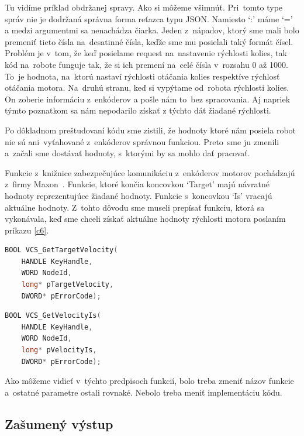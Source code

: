 Tu vidíme príklad obdržanej spravy. Ako si môžeme všimnúť. Pri~tomto type správ nie je dodržaná správna forma reťazca typu JSON. Namiesto `:' máme `='
a medzi argumentmi sa nenachádza čiarka. Jeden z~nápadov, ktorý sme mali bolo premeniť tieto čísla na~desatinné čísla, keďže sme mu posielali taký formát čísel.
Problém je v~tom, že keď posielame request na~nastavenie rýchlosti kolies, tak kód na~robote funguje tak, že si ich premení na~celé čísla v~rozsahu 0 až 1000.
To~je hodnota, na~ktorú nastaví rýchlosti otáčania kolies respektíve rýchlosť otáčania motora. Na~druhú stranu, keď si vypýtame od~robota rýchlosti kolies. On zoberie
informáciu z~enkóderov a pošle nám to~bez spracovania. Aj napriek týmto poznatkom sa nám nepodarilo získať z týchto dát žiadané rýchlosti.

Po dôkladnom preštudovaní kódu sme zistili, že hodnoty ktoré nám posiela robot nie sú ani~vyťahované z~enkóderov správnou funkciou. Preto~sme ju zmenili
a~začali sme dostávať hodnoty, s~ktorými by sa mohlo dať pracovať.

Funkcie z~knižnice zabezpečujúce komunikáciu z~enkóderov motorov pochádzajú z~firmy Maxon~\cite{EPOSdoc}. Funkcie, ktoré končia koncovkou `Target' majú
návratné hodnoty reprezentujúce žiadané hodnoty. Funkcie s~koncovkou `Is' vracajú aktuálne hodnoty. Z~tohto dôvodu sme museli prepísať funkciu, ktorá sa vykonávala,
keď sme chceli získať aktuálne hodnoty rýchlosti motora poslaním príkazu \ref{c6}.


\label{VelocityIs}
\begin{lstlisting}[language=C++]
BOOL VCS_GetTargetVelocity(
	HANDLE KeyHandle,
	WORD NodeId,
	long* pTargetVelocity,
	DWORD* pErrorCode);
\end{lstlisting}

\begin{lstlisting}[language=C++]
BOOL VCS_GetVelocityIs(
	HANDLE KeyHandle,
	WORD NodeId,
	long* pVelocityIs,
	DWORD* pErrorCode);
\end{lstlisting}

\noindent Ako môžeme vidieť v~týchto predpisoch funkcií, bolo treba zmeniť názov funkcie a~ostatné parametre ostali rovnaké.
Nebolo treba meniť implementáciu kódu.

\subsection{Zašumený výstup}

